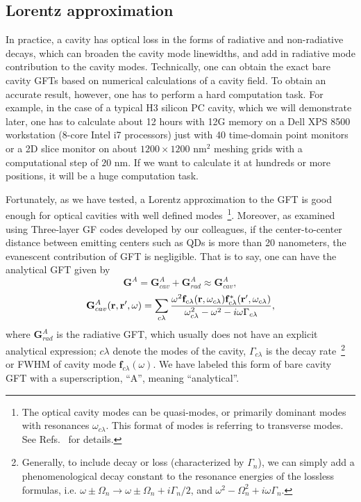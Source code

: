 


\subsection{Lorentz approximation}\label{section:Lorentz}
In practice, a cavity has optical loss in the forms of radiative and non-radiative decays, which can broaden the cavity mode linewidths, and add in radiative mode contribution to the cavity modes. Technically, one can obtain the exact bare cavity GFTs based on numerical calculations of a cavity field. To obtain an accurate result, however, one has to perform a hard computation task. For example, in the case of a typical H3 silicon PC cavity, which we will demonstrate later, one has to calculate about 12 hours with 12G memory on a Dell XPS 8500 workstation (8-core Intel i7 processors) just with 40 time-domain point monitors or a 2D slice monitor on about $1200\times1200$ nm$^2$ meshing grids with a computational step of $20$ nm. If we want to calculate it at hundreds or more positions, it will be a huge computation task.

Fortunately, as we have tested, a Lorentz approximation to the GFT is good enough for optical cavities with well defined modes~\footnote{The optical cavity modes can be quasi-modes, or primarily dominant modes with resonances $\omega_{c\lambda}$. This format of modes is referring to transverse modes.  See Refs.~\cite{VanVlack2012,Kristensen2011} for details.}. Moreover, as examined using Three-layer GF codes developed by our colleagues, if the center-to-center distance between emitting centers such as QDs is more than 20 nanometers, the evanescent contribution of GFT is negligible. That is to say, one can have the analytical GFT given by
\begin{equation}
 \label{Ganal}
\mathbf{G}^{A}=\mathbf{G}^{A}_{cav}+\mathbf{G}^{A}_{rad}\approx \mathbf{G}^{A}_{cav},
\end{equation}
\begin{equation}
 \label{Gcav}
\mathbf{G}^{A}_{cav}(\mathbf{r},\mathbf{r}',\omega)=\sum_{c\lambda}{\frac{\omega^2\mathbf{f}_{c\lambda}(\mathbf{r},\omega_{c\lambda})\mathbf{f}_{c\lambda}^*(\mathbf{r}',\omega_{c\lambda})}
{\omega_{c\lambda}^2-\omega^2-i\omega\Gamma_{c\lambda}}},
\end{equation}
where $\mathbf{G}^{A}_{rad}$ is the radiative GFT, which usually does not have an explicit analytical expression; $c\lambda$ denote the modes of the cavity, $\Gamma_{c\lambda}$ is the decay rate~\footnote{Generally, to include decay or loss (characterized by $\Gamma_n$), we can simply add a phenomenological decay constant to the resonance energies of the lossless formulas, i.e.
$\omega \pm \Omega_n \rightarrow \omega\pm \Omega_n +
i\Gamma_n/2$, and $\omega^2- \Omega_n^2+
i\omega\Gamma_n$.\label{fn:decayrevision}} or FWHM of cavity mode $\mathbf{f}_{c\lambda}(\omega)$. We have labeled this form of bare cavity GFT with a superscription, ``A'', meaning ``analytical''.


